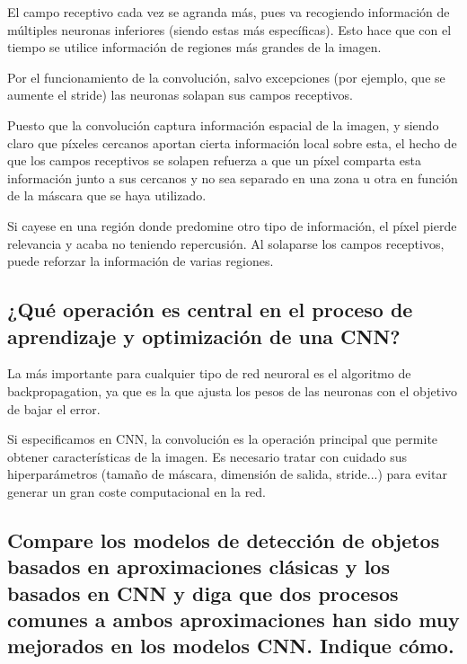 \documentclass[11pt]{scrartcl} %
\begin{document}

El campo receptivo cada vez se agranda más, pues va recogiendo información de 
múltiples neuronas inferiores (siendo estas más específicas). Esto hace que con el 
tiempo se utilice información de regiones más grandes de la imagen. \newline

Por el funcionamiento de la convolución, salvo excepciones (por ejemplo, que se 
aumente el stride) las neuronas solapan sus campos receptivos. \newline

Puesto que la convolución captura información espacial de la imagen, y
siendo claro que píxeles cercanos aportan cierta información local sobre esta, el hecho
de que los campos receptivos se solapen refuerza a que un píxel comparta esta
información junto a sus cercanos y no sea separado en una zona u otra en función
de la máscara que se haya utilizado. \newline 

Si cayese en una región donde predomine otro
tipo de información, el píxel pierde relevancia y acaba no teniendo repercusión.
Al solaparse los campos receptivos, puede reforzar la información de varias regiones.

\subsection{¿Qué operación es central en el proceso de aprendizaje y
optimización de una CNN?}


La más importante para cualquier tipo de red neuroral es el algoritmo de 
backpropagation, ya que es la que ajusta los pesos de las neuronas con el 
objetivo de bajar el error. \newline

Si especificamos en CNN, la convolución es la operación principal que permite
obtener características de la imagen. Es necesario tratar con cuidado sus
hiperparámetros (tamaño de máscara, dimensión de salida, stride...) para evitar
generar un gran coste computacional en la red.

\subsection{Compare los modelos de detección de objetos basados en
aproximaciones clásicas y los basados en CNN y diga que dos procesos
comunes a ambos aproximaciones han sido muy mejorados en los modelos
CNN. Indique cómo.}
\end{document}
